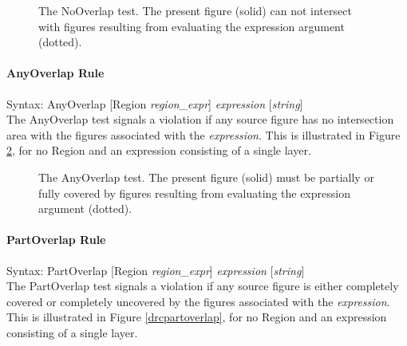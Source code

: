 \begin{figure}
\caption{\label{drcnooverlap} The {\et NoOverlap} test.  The present
figure (solid) can not intersect with figures resulting from
evaluating the expression argument (dotted).}
\vspace{1.5ex}
\begin{center}
\end{center}
\end{figure}

\paragraph{{\et AnyOverlap} Rule}

\begin{description}
\item{Syntax: {\vt AnyOverlap} [{\vt Region} {\it region\_expr\/}]
    {\it expression} [{\it string\/}]}\\

The {\et AnyOverlap} test signals a violation if any source figure has
no intersection area with the figures associated with the {\it
expression\/}.  This is illustrated in Figure \ref{drcanyoverlap}, for
no {\et Region} and an expression consisting of a single layer.
\end{description}

\begin{figure}
\caption{\label{drcanyoverlap} The {\et AnyOverlap} test.  The present
figure (solid) must be partially or fully covered by figures resulting
from evaluating the expression argument (dotted).}
\vspace{1.5ex}
\begin{center}
\end{center}
\end{figure}

\paragraph{{\et PartOverlap} Rule}

\begin{description}
\item{Syntax: {\vt PartOverlap} [{\vt Region} {\it region\_expr\/}]
    {\it expression} [{\it string\/}]}\\

The {\et PartOverlap} test signals a violation if any source figure is
either completely covered or completely uncovered by the figures
associated with the {\it expression\/}.  This is illustrated in Figure
\ref{drcpartoverlap}, for no {\et Region} and an expression consisting
of a single layer.
\end{description}

